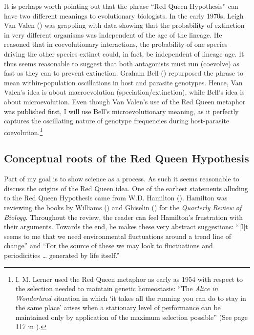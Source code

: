 \documentclass[
  letterpaper,
]{book}
\begin{document}
It is perhaps worth pointing out that the phrase ``Red Queen
Hypothesis'' can have two different meanings to evolutionary biologists.
In the early 1970s, Leigh Van Valen ()
was grappling with data showing that the probability of extinction in
very different organisms was independent of the age of the lineage. He
reasoned that in coevolutionary interactions, the probability of one
species driving the other species extinct could, in fact, be independent
of lineage age. It thus seems reasonable to suggest that both
antagonists must run (coevolve) as fast as they can to prevent
extinction. Graham Bell () repurposed the
phrase to mean within-population oscillations in host and parasite
genotypes. Hence, Van Valen's idea is about macroevolution
(speciation/extinction), while Bell's idea is about microevolution. Even
though Van Valen's use of the Red Queen metaphor was published first, I
will use Bell's microevolutionary meaning, as it perfectly captures the
oscillating nature of genotype frequencies during host-parasite
coevolution.\footnote{I. M. Lerner used the Red Queen metaphor as early
  as 1954 with respect to the selection needed to maintain genetic
  homeostasis: ``The \emph{Alice in Wonderland} situation in which `it
  takes all the running you can do to stay in the same place' arises
  when a stationary level of performance can be maintained only by
  application of the maximum selection possible'' (See page 117 in
  ).}

\subsection{Conceptual roots of the Red Queen
Hypothesis}\label{conceptual-roots-of-the-red-queen-hypothesis}

Part of my goal is to show science as a process. As such it seems
reasonable to discuss the origins of the Red Queen idea. One of the
earliest statements alluding to the Red Queen Hypothesis came from W.D.
Hamilton (). Hamilton was reviewing
the books by Williams () and Ghiselin
() for the \emph{Quarterly Review of
Biology}. Throughout the review, the reader can feel Hamilton's
frustration with their arguments. Towards the end, he makes these very
abstract suggestions: ``{[}I{]}t seems to me that we need environmental
fluctuations around a trend line of change'' and ``For the source of
these we may look to fluctuations and periodicities \ldots{} generated
by life itself.''
\end{document}
